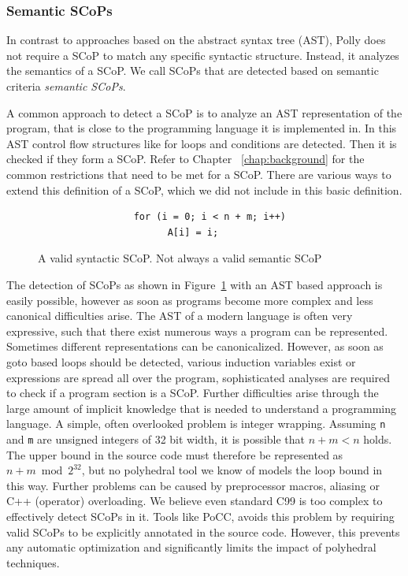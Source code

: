 \subsubsection{Semantic SCoPs}

In contrast to approaches based on the abstract syntax
tree (AST), Polly does not require a SCoP to match any specific syntactic
structure. Instead, it analyzes the semantics of a SCoP. We call SCoPs
that are detected based on semantic criteria \emph{semantic SCoPs}.

A common approach to detect a SCoP is to analyze an AST representation of
the program, that is close to the programming language it is implemented in. In
this AST control flow structures like for loops and conditions are
detected. Then it is checked if they form a SCoP. Refer to Chapter ~\ref{chap:background} for the common restrictions that need
to be met for a SCoP. There are various ways to
extend this definition of a SCoP, which we did not include in this basic
definition.

\begin{figure}
\begin{lstlisting}
                 for (i = 0; i < n + m; i++)
                       A[i] = i;
\end{lstlisting}
	\caption{A valid syntactic SCoP. Not always a valid semantic SCoP}
	\label{fig:syntacticScop}
\end{figure}

The detection of SCoPs as shown in Figure~\ref{fig:syntacticScop} with an AST
based approach is easily possible, however as soon as programs become more
complex and less canonical difficulties arise. The AST of a modern language is
often very expressive, such that there exist numerous ways a program can be
represented.  Sometimes different representations can be canonicalized.
However, as soon as goto based loops should be detected, various induction
variables exist or expressions are spread all over the program, sophisticated
analyses are required to check if a program section is a SCoP. Further
difficulties arise through the large amount of implicit knowledge that is
needed to understand a programming language.  A simple, often overlooked problem is integer
wrapping.  Assuming \texttt{n} and \texttt{m} are unsigned integers of 32 bit
width, it is possible that $n+m < n$ holds. The upper bound in the source code must
therefore be represented as $n+m\bmod 2^{32}$, but no polyhedral tool we know
of models the loop bound in this way. Further problems can be caused by
preprocessor macros, aliasing or C++ (operator) overloading. We believe even
standard C99 is too complex to effectively detect SCoPs in it. Tools like PoCC,
avoids this problem by requiring valid SCoPs to be explicitly annotated in the
source code. However, this prevents any automatic optimization and
significantly limits the impact of polyhedral techniques.


